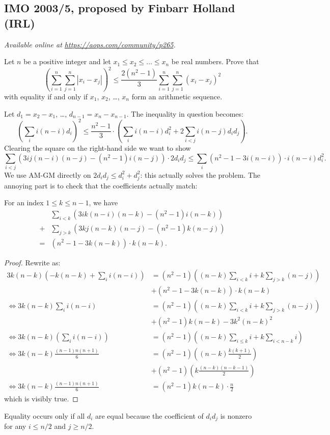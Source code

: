 \documentclass[11pt]{scrartcl}
\begin{document}
\subsection{IMO 2003/5, proposed by Finbarr Holland (IRL)}
\textsl{Available online at \url{https://aops.com/community/p265}.}
\begin{mdframed}[style=mdpurplebox,frametitle={Problem statement}]
Let $n$ be a positive integer and
let $x_1 \le x_2 \le \dots \le x_n$ be real numbers.
Prove that
\[ \left(\sum_{i=1}^{n}\sum_{j=1}^{n} |x_i - x_j|\right)^2
  \le \frac{2(n^2-1)}{3}\sum_{i=1}^{n}\sum_{j=1}^{n} (x_i - x_j)^2 \]
with equality if and only if $x_1$, $x_2$, \dots, $x_n$
form an arithmetic sequence.
\end{mdframed}
Let $d_1 = x_2 - x_1$, \dots, $d_{n-1} = x_n - x_{n-1}$.
The inequality in question becomes:
\[
  \left( \sum_i i(n-i) d_i \right)^2
  \le
  \frac{n^2-1}{3} \cdot
  \left( \sum_i i(n-i) d_i^2 + 2\sum_{i<j} i(n-j) d_i d_j  \right).
\]
Clearing the square on the right-hand side we want to show
\[
  \sum_{i<j} \left( 3ij(n-i)(n-j) - (n^2-1)i(n-j) \right) \cdot 2d_i d_j
  \le \sum_i (n^2-1-3i(n-i)) \cdot i(n-i) d_i^2.
\]
We use AM-GM directly on $2d_i d_j \le d_i^2 + d_j^2$:
this actually solves the problem.
The annoying part is to check that the coefficients actually match:
\begin{claim*}
  For an index $1 \le k \le n-1$, we have
  \begin{align*}
    &\sum_{i<k} \left( 3ik(n-i)(n-k) - (n^2-1)i(n-k) \right) \\
    +& \sum_{j>k} \left( 3kj(n-k)(n-j) - (n^2-1)k(n-j) \right) \\
    = & (n^2-1-3k(n-k)) \cdot k(n-k).
  \end{align*}
\end{claim*}
\begin{proof}
  Rewrite as:
  \begin{align*}
    3k(n-k) \left( -k(n-k) + \sum_i i(n-i) \right)
      &= (n^2-1)\left( (n-k)\sum_{i<k} i + k\sum_{j>k} (n-j) \right) \\
      &+ (n^2-1-3k(n-k)) \cdot k(n-k) \\
    \iff 3k(n-k) \sum_i i(n-i)
      &= (n^2-1) \left( (n-k)\sum_{i<k} i + k\sum_{j>k}(n-j) \right) \\
      &+ (n^2-1)k(n-k) - 3k^2(n-k)^2 \\
    \iff 3k(n-k) \left( \sum_{i} i(n-i) \right)
      &= (n^2-1) \left( (n-k)\sum_{i \le k} i + k \sum_{i < n-k} i \right) \\
    \iff 3k(n-k) \frac{(n-1)n(n+1)}{6}
      &= (n^2-1) \left( (n-k)\frac{k(k+1)}{2} \right) \\
      & + (n^2-1) \left( k \frac{(n-k)(n-k-1)}{2} \right) \\
    \iff 3k(n-k) \frac{(n-1)n(n+1)}{6}
      &= (n^2-1)k(n-k) \cdot \frac n2
  \end{align*}
  which is visibly true.
\end{proof}
Equality occurs only if all $d_i$ are equal
because the coefficient of $d_i d_j$ is nonzero
for any $i \le n/2$ and $j \ge n/2$.
\pagebreak
\end{document}
